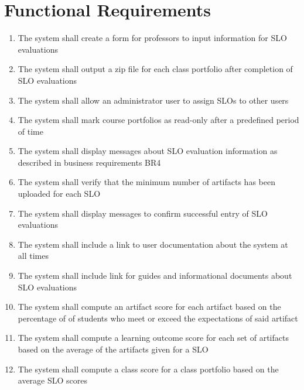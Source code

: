 \documentclass[a4paper,12pt]{article}
\begin{document}
\section*{Functional Requirements}
\begin{enumerate}[label=FR\arabic*.]
\item The system shall create a form for professors to input information for SLO evaluations
\item The system shall output a zip file for each class portfolio after completion of SLO evaluations
\item The system shall allow an administrator user to assign SLOs to other users
\item The system shall mark course portfolios as read-only after a predefined period of time
\item The system shall display messages about SLO evaluation information as described in business requirements BR4
\item The system shall verify that the minimum number of artifacts has been uploaded for each SLO
\item The system shall display messages to confirm successful entry of SLO evaluations 
\item The system shall include a link to user documentation about the system at all times
\item The system shall include link for guides and informational documents about SLO evaluations
\item The system shall compute an artifact score for each artifact  based on the percentage of of students who meet or exceed the expectations of said artifact
\item The system shall compute a learning outcome score for each set of artifacts based on the average of the artifacts given for a SLO
\item The system shall compute a class score for a class portfolio based on the average SLO scores
\end{enumerate}
\end{document}
